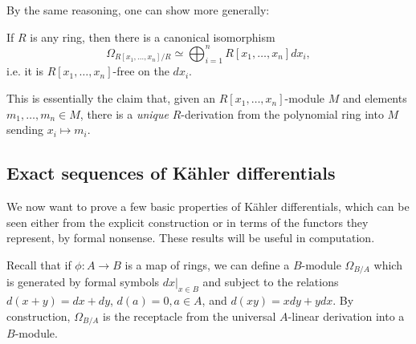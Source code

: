 By the same reasoning, one can show more generally:
\begin{proposition} 
If $R$ is any ring, then there is a canonical isomorphism
\[ \Omega_{R[x_1, \dots, x_n]/R} \simeq \bigoplus_{i=1}^n R[x_1, \dots, x_n]
dx_i,  \]
i.e. it is $R[x_1, \dots, x_n]$-free on the $dx_i$.
\end{proposition} 

This is essentially the claim that, given an $R[x_1, \dots, x_n]$-module $M$
and elements $m_1, \dots, m_n \in M$, there is a \emph{unique} $R$-derivation
from the polynomial ring into $M$ sending $x_i\mapsto m_i$.
\subsection{Exact sequences of K\"ahler differentials}
We now want to prove a few basic properties of K\"ahler differentials, which
can be seen either from the explicit construction or in terms of the functors
they represent, by formal nonsense.
These results will be useful in computation.

 Recall that if
$\phi: A \to B$ is a map of rings, we can define a $B$-module
\( \Omega_{B/A}\)  which is generated by formal symbols $ dx|_{x \in
B}$ and subject to the relations $d(x+y) = dx+dy$, $d(a)=0, a \in A$,
and $d(xy) = xdy + ydx$.
By construction, $\Omega_{B/A}$ is the receptacle from the universal $A$-linear
derivation into a $B$-module.

